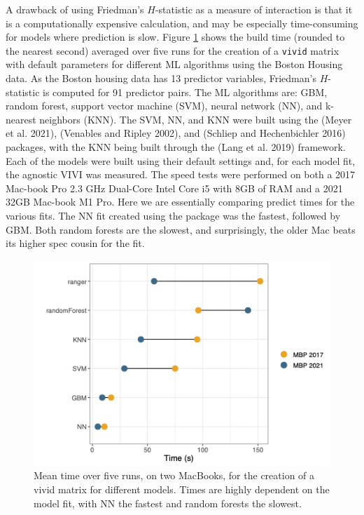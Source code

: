 A drawback of using Friedman's \(H\)-statistic as a measure of interaction is that it is a computationally expensive calculation, and may be especially time-consuming for models where prediction is slow.
Figure \ref{fig:speedtest}
shows the build time (rounded to the nearest second) averaged over five runs for the creation of a \texttt{vivid} matrix with default parameters for different ML algorithms using the Boston Housing data. As the Boston housing data has 13 predictor variables, Friedman's \(H\)-statistic is computed for 91 predictor pairs. The ML algorithms are: GBM, random forest, support vector machine (SVM), neural network (NN), and k-nearest neighbors (KNN). The SVM, NN, and KNN were built using the  (Meyer et al. 2021),  (Venables and Ripley 2002), and  (Schliep and Hechenbichler 2016) packages, with the KNN being built through the  (Lang et al. 2019) framework. Each of the models were built using their default settings and, for each model fit, the agnostic VIVI was measured. The speed tests were performed on both a 2017 Mac-book Pro 2.3 GHz Dual-Core Intel Core i5 with 8GB of RAM and a 2021 32GB Mac-book M1 Pro. Here we are essentially comparing predict times for the various fits. The NN fit created using the  package was the fastest, followed by GBM. Both random forests are the slowest, and surprisingly, the older Mac beats its higher spec cousin for the  fit.

\begin{figure}

{\centering \includegraphics[width=0.6\linewidth]{speedTestsplot} 

}

\caption{Mean time over five runs, on two MacBooks, for the creation of a vivid matrix for different models. Times are highly dependent on the model fit, with NN the fastest and random forests the slowest.}\label{fig:speedtest}
\end{figure}

